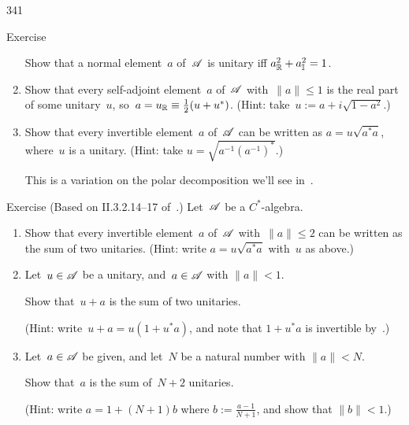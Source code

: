 \begin{parsec}{341}
\begin{point}{50}{Exercise}
\begin{enumerate}
Show that a normal element~$a$ of~$\mathscr{A}$ is unitary
        iff $a_{\mathbb{R}}^2 + a_{\mathbb{I}}^2 = 1$.
\item
Show that every self-adjoint element~$a$ of~$\mathscr{A}$
with~$\|a\|\leq 1$
is the real part of some unitary~$u$, 
        so~$a=u_{\mathbb{R}}\equiv \frac{1}{2}(u+u^*)$.
(Hint:
        take~$u := a + i\sqrt{1-a^2}$.)
\item
Show that every invertible element~$a$ of~$\mathscr{A}$ can be written
as $a=u\sqrt{a^*a}$,
where~$u$ is a unitary.
(Hint: take $u=\sqrt{a^{-1}(a^{-1})^*}$.)

This is a variation on the polar decomposition
we'll see in~.
\end{enumerate}
\end{point}
\begin{point}{60}{Exercise}
(Based on II.3.2.14--17 of~\cite{blackadar2006operator}.)
Let~$\mathscr{A}$ be a $C^*$-algebra.
\begin{enumerate}
\item
Show that every invertible element~$a$ of~$\mathscr{A}$
with~$\|a\|\leq 2$ can be written
as the sum of two unitaries.
(Hint: write $a=u\sqrt{a^*a}$ with~$u$ as above.)
\item
Let~$u\in \mathscr{A}$ be a unitary, and~$a\in\mathscr{A}$ with $\|a\|< 1$.

Show that~$u+a$ is the sum of two unitaries.

(Hint: write~$u+a=u(1+u^*a)$, and
        note that $1+u^*a$ is invertible by~.)
\item
Let~$a\in \mathscr{A}$ be given,
and let~$N$ be a natural number with $\|a\| < N$.

Show that~$a$ is the sum of~$N+2$ unitaries. 

(Hint: write $a=1+(N+1)b$ where $b:=\frac{a-1}{N+1}$,
and show that $\|b\|< 1$.)


\end{enumerate}
\end{point}
\end{parsec}
